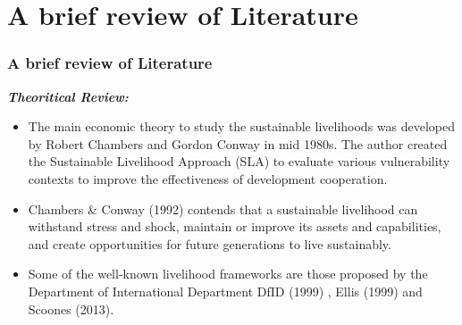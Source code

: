 \documentclass{beamer}
\newcommand{\coloredcite}[2]{\textcolor{blue}{\cite{#2}}}
\begin{document}
	\section{A brief review of Literature}
	\begin{frame}[allowframebreaks]
		\frametitle{A brief review of Literature}
		\textbf{\textit{Theoritical Review:}}
		\begin{itemize}
			\item \begin{justify} \small The main economic theory to study the sustainable livelihoods was developed by Robert Chambers and Gordon Conway in mid 1980s. The author created the Sustainable Livelihood Approach (SLA) to evaluate various vulnerability contexts to improve the effectiveness of development cooperation.
			\end{justify}
			
			\item \begin{justify} \small Chambers \& Conway (1992) contends that a sustainable livelihood can withstand stress and shock, maintain or improve its assets and capabilities, and create opportunities for future generations to live sustainably\small\coloredcite{}{r21}.
			\end{justify}
			\item \begin{justify} \small Some of the well-known livelihood frameworks are those proposed by the Department of International Department DfID (1999) \small\coloredcite{}{r22}, Ellis (1999) \small\coloredcite{}{r23} and Scoones (2013)\small\coloredcite{}{r24}.
			\end{justify}
		\end{itemize}
	\end{frame}
\end{document}
